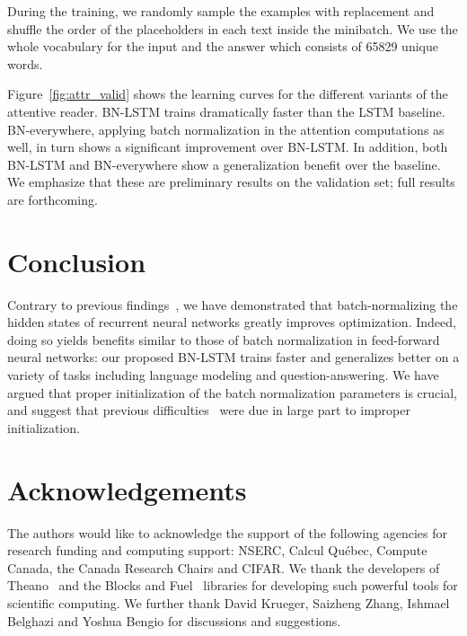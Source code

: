 \documentclass{article} %
\begin{document}
During the training, we randomly sample the examples with replacement and shuffle the order of the placeholders in each text inside the minibatch. We use the whole vocabulary for the input and the answer which consists of 65829 unique words.

Figure~\ref{fig:attr_valid} shows the learning curves for the different variants of the attentive reader.
BN-LSTM trains dramatically faster than the LSTM baseline.
BN-everywhere, applying batch normalization in the attention computations as well, in turn shows a significant
improvement over BN-LSTM.
In addition, both BN-LSTM and BN-everywhere show a generalization benefit over the baseline.
We emphasize that these are preliminary results on the validation set; full results are forthcoming.

\section{Conclusion}

Contrary to previous findings~\cite{cesar,baidu},
we have demonstrated that batch-normalizing the hidden states of recurrent neural networks greatly improves optimization.
Indeed, doing so yields benefits similar to those of batch normalization in feed-forward neural networks:
our proposed BN-LSTM trains faster and generalizes better on a variety of tasks including language modeling and question-answering.
We have argued that proper initialization of the batch normalization parameters is crucial,
and suggest that previous difficulties~\cite{cesar, baidu} were due in large part to improper initialization.

\section*{Acknowledgements}

The authors would like to acknowledge the support of the following agencies for
research funding and computing support: NSERC, Calcul Qu\'{e}bec, Compute Canada,
the Canada Research Chairs and CIFAR.
We thank the developers of Theano~\cite{theano2} and the
Blocks and Fuel~\cite{blocks} libraries for developing such powerful tools for scientific computing.
We further thank David Krueger, Saizheng Zhang, Ishmael Belghazi and Yoshua Bengio for discussions and suggestions.



\end{document}
